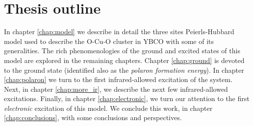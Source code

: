 \section{Thesis outline}
\label{sec:outline}


In chapter \ref{chap:model} we describe in detail the three sites Peierls-Hubbard model used to describe the O-Cu-O cluster in YBCO with some of its generalities. 
The rich phenomenologies of the ground and excited states of this model are explored in the remaining chapters. 
Chapter \ref{chap:ground} is devoted to the ground state (identified also as the \textit{polaron formation energy}). 
In chapter \ref{chap:polaron} we turn to the first infrared-allowed excitation of the system. 
Next, in chapter \ref{chap:more_ir}, we describe the next few infrared-allowed excitations. 
Finally, in chapter \ref{chap:electronic}, we turn our attention to the first \textit{electronic} excitation of this model. 
We conclude this work, in chapter \ref{chap:conclusions}, with some conclusions and perspectives.
